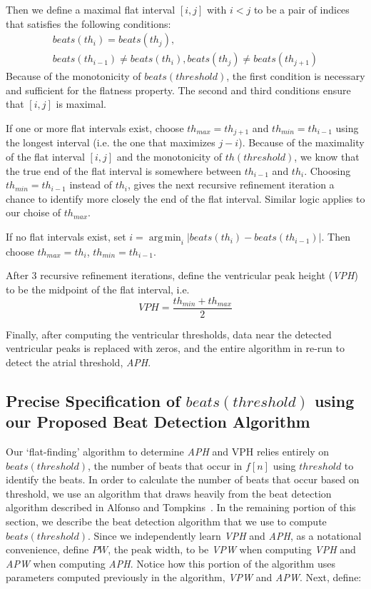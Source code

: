 \documentclass[conference]{IEEEtran}
\newcommand{\APW}{\textit{APW}}
\newcommand{\VPW}{\textit{VPW}}
\newcommand{\APH}{\textit{APH}}
\newcommand{\VPH}{\textit{VPH}}
\DeclareMathOperator*{\argmin}{arg\,min}
\begin{document}
Then we define a maximal flat interval $[i,j]$ with $i<j$ to be a pair of indices that satisfies the following conditions:
\begin{multline*}
	beats(th_i) = beats(th_j),\\ beats(th_{i-1}) \ne beats(th_i), beats(th_j) \ne beats(th_{j+1})
\end{multline*}
Because of the monotonicity of $beats(threshold)$, the first condition is necessary and sufficient for the flatness property.
The second and third conditions ensure that $[i,j]$ is maximal.

If one or more flat intervals exist, choose $th_{max} = th_{j+1}$ and $th_{min}=th_{i-1}$ using the longest interval (i.e. the one that maximizes $j-i$).
Because of the maximality of the flat interval $[i,j]$ and the monotonicity of $th(threshold)$, 
we know that the true end of the flat interval is somewhere between $th_{i-1}$ and $th_i$. 
Choosing $th_{min} = th_{i-1}$ instead of $th_{i}$, gives the next recursive refinement iteration a chance to identify more closely the end of the flat interval.
Similar logic applies to our choise of $th_{max}$.

If no flat intervals exist, set $i=\argmin_{i} |beats(th_i) - beats(th_{i-1})|$.
Then choose $th_{max} = th_i$, $th_{min} = th_{i-1}$.

After 3 recursive refinement iterations, define the ventricular peak height (\VPH{}) to be the midpoint of the flat interval, i.e.
\begin{equation*}
	VPH=\frac{th_{min}+th_{max}}{2}
\end{equation*}

Finally, after computing the ventricular thresholds,
data near the detected ventricular peaks is replaced with
zeros, and the entire algorithm in re-run to detect the
atrial threshold, \APH{}.

\subsection{Precise Specification of $beats(threshold)$ using our Proposed Beat Detection Algorithm}
Our `flat-finding' algorithm to determine \APH{} and
VPH relies entirely on $beats(threshold)$, 
the number of beats that occur in $f[n]$ using
$threshold$ to identify the beats. In order to calculate the
number of beats that occur based on threshold, we use
an algorithm that draws heavily from the beat
detection algorithm described in Alfonso and Tompkins~\cite{realtime-qrs}.
In the remaining portion of this section, we describe
the beat detection algorithm that we use to compute
$beats(threshold)$.
Since we independently learn \VPH{} and \APH{}, as a notational convenience, define $PW$, the peak width, to be \VPW{} when computing \VPH{} and \APW{} when computing \APH{}.
Notice how this portion of the algorithm uses parameters computed previously in the algorithm, \VPW{} and \APW{}.
Next, define:
\end{document}
